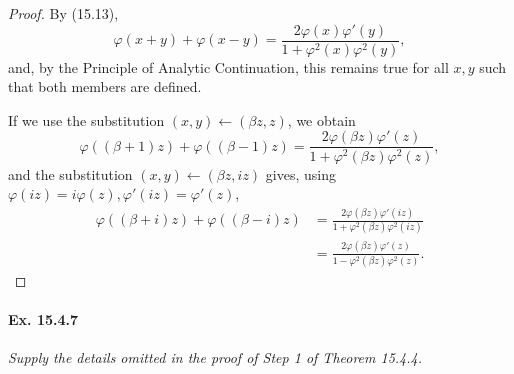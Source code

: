 \documentclass[11pt,a4paper]{article}
\begin{document}
\begin{proof} 
By (15.13),
$$\varphi(x+y)+ \varphi(x-y) = \frac{2 \varphi(x) \varphi'(y)}{1 + \varphi^2(x) \varphi^2(y)},$$
and, by the Principle of Analytic Continuation, this remains true for all $x,y$ such that both members are defined.

If we use the substitution $(x,y) \leftarrow (\beta z, z)$, we obtain
$$\varphi((\beta + 1)z) + \varphi((\beta-1)z) = \frac{2 \varphi(\beta z)\varphi'(z)}{1 + \varphi^2(\beta z) \varphi^2(z)},$$
and the substitution $(x,y) \leftarrow (\beta z, iz)$ gives, using $\varphi(iz) = i \varphi(z), \varphi'(iz) = \varphi'(z)$,
\begin{align*}
\varphi((\beta + i)z) + \varphi((\beta-i)z) &= \frac{2 \varphi(\beta z)\varphi'(iz)}{1 + \varphi^2(\beta z) \varphi^2(iz)}\\
&=\frac{2 \varphi(\beta z)\varphi'(z)}{1 - \varphi^2(\beta z) \varphi^2(z)}.
\end{align*}
\end{proof}

\paragraph{Ex. 15.4.7}{\it Supply the details omitted in the proof of Step 1 of Theorem 15.4.4.
}
\end{document}
